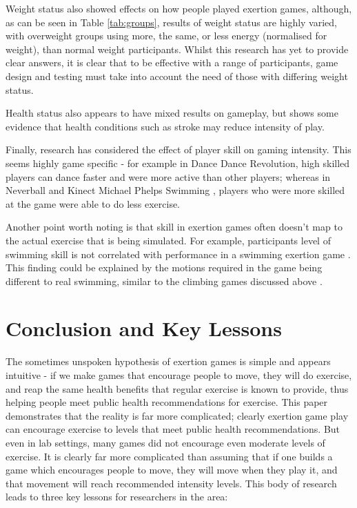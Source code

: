 Weight status also showed effects on how people played exertion games, although, as can be seen in Table \ref{tab:groups}, results of weight status are highly varied, with overweight groups using more, the same, or less energy (normalised for weight), than normal weight participants. Whilst this research has yet to provide clear answers, it is clear that to be effective with a range of participants,  game design and testing must take into account the need of those with differing weight status.

Health status also appears to have mixed results on gameplay, but shows some evidence that health conditions such as stroke may reduce intensity of play.

Finally, research has considered the effect of player skill on gaming intensity. This seems highly game specific - for example in Dance Dance Revolution, high skilled players can dance faster and were more active than other players; whereas in Neverball \cite{Berkovsky2012PhysicalReward} and Kinect Michael Phelps Swimming \cite{Soltani2017PhysiologicalExperience}, players who were more skilled at the game were able to do less exercise. 

Another point worth noting is that skill in exertion games often doesn't map to the actual exercise that is being simulated. For example, participants level of swimming skill is not correlated with performance in a swimming exertion game \cite{Soltani2017PhysiologicalExperience}. This finding could be explained by the motions required in the game being different to real swimming, similar to the climbing games discussed above \cite{Jenny2015VirtualPerceptions}.

\section{Conclusion and Key Lessons}

The sometimes unspoken hypothesis of exertion games is simple and appears intuitive - if we make games that encourage people to move, they will do exercise, and reap the same health benefits that regular exercise is known to provide, thus helping people meet public health recommendations for exercise. This paper demonstrates that the reality is far more complicated; clearly exertion game play can encourage exercise to levels that meet public health recommendations. But even in lab settings, many games did not encourage even moderate levels of exercise. It is clearly far more complicated than assuming that if one builds a game which encourages people to move, they will move when they play it, and that movement will reach recommended intensity levels. This body of research leads to three key lessons for researchers in the area:

